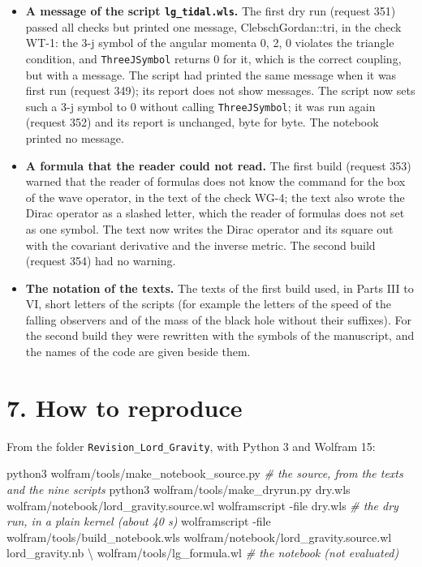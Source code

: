\documentclass[
  10pt,
]{article}
\newenvironment{Shaded}{}{}
\newcommand{\AttributeTok}[1]{\textcolor[rgb]{0.49,0.56,0.16}{#1}}
\newcommand{\CommentTok}[1]{\textcolor[rgb]{0.38,0.63,0.69}{\textit{#1}}}
\newcommand{\DataTypeTok}[1]{\textcolor[rgb]{0.56,0.13,0.00}{#1}}
\newcommand{\ExtensionTok}[1]{#1}
\newcommand{\NormalTok}[1]{#1}
\providecommand{\tightlist}{%
  \setlength{\itemsep}{0pt}\setlength{\parskip}{0pt}}
\begin{document}
\begin{itemize}
\tightlist
\item
  \textbf{A message of the script \texttt{lg\_tidal.wls}.} The first dry
  run (request 351) passed all checks but printed one message,
  ClebschGordan::tri, in the check WT-1: the 3-j symbol of the angular
  momenta 0, 2, 0 violates the triangle condition, and
  \texttt{ThreeJSymbol} returns 0 for it, which is the correct coupling,
  but with a message. The script had printed the same message when it
  was first run (request 349); its report does not show messages. The
  script now sets such a 3-j symbol to 0 without calling
  \texttt{ThreeJSymbol}; it was run again (request 352) and its report
  is unchanged, byte for byte. The notebook printed no message.
\item
  \textbf{A formula that the reader could not read.} The first build
  (request 353) warned that the reader of formulas does not know the
  command for the box of the wave operator, in the text of the check
  WG-4; the text also wrote the Dirac operator as a slashed letter,
  which the reader of formulas does not set as one symbol. The text now
  writes the Dirac operator and its square out with the covariant
  derivative and the inverse metric. The second build (request 354) had
  no warning.
\item
  \textbf{The notation of the texts.} The texts of the first build used,
  in Parts III to VI, short letters of the scripts (for example the
  letters of the speed of the falling observers and of the mass of the
  black hole without their suffixes). For the second build they were
  rewritten with the symbols of the manuscript, and the names of the
  code are given beside them.
\end{itemize}

\hypertarget{how-to-reproduce}{%
\section{7. How to reproduce}\label{how-to-reproduce}}

From the folder \texttt{Revision\_Lord\_Gravity}, with Python 3 and
Wolfram 15:

\begin{Shaded}
\begin{Highlighting}[]
\ExtensionTok{python3}\NormalTok{ wolfram/tools/make\_notebook\_source.py                    }\CommentTok{\# the source, from the texts and the nine scripts}
\ExtensionTok{python3}\NormalTok{ wolfram/tools/make\_dryrun.py dry.wls wolfram/notebook/lord\_gravity.source.wl}
\ExtensionTok{wolframscript} \AttributeTok{{-}file}\NormalTok{ dry.wls                                     }\CommentTok{\# the dry run, in a plain kernel (about 40 s)}
\ExtensionTok{wolframscript} \AttributeTok{{-}file}\NormalTok{ wolfram/tools/build\_notebook.wls wolfram/notebook/lord\_gravity.source.wl lord\_gravity.nb }\DataTypeTok{\textbackslash{}}
\NormalTok{    wolfram/tools/lg\_formula.wl                                 }\CommentTok{\# the notebook (not evaluated)}
\end{Highlighting}
\end{Shaded}
\end{document}

